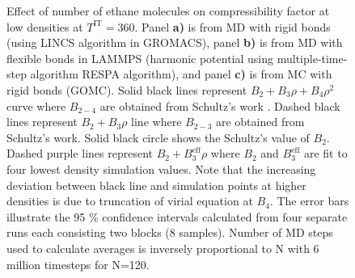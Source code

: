 \documentclass[5p,times]{elsarticle}
\begin{document}
\begin{figure}
\caption{ Effect of number of ethane molecules on compressibility factor at low densities at $T^{\mathrm{IT}}=360$. Panel \textbf{a)} is from MD with rigid bonds (using LINCS algorithm \cite{hess1997lincs} in GROMACS), panel \textbf{b)} is from MD with flexible bonds in LAMMPS (harmonic potential using multiple-time-step algorithm RESPA \cite{tuckerman1992} algorithm), and panel \textbf{c)} is from MC with rigid bonds (GOMC). 
Solid black lines represent $B_2+B_3 \rho+B_4 \rho^2$ curve where $B_{2-4}$ are obtained from Schultz's work \cite{Schultz2010a}. Dashed black lines represent $B_2+B_3 \rho$ line where $B_{2-3}$ are obtained from Schultz's work. Solid black circle shows the Schultz's value of $B_2$. Dashed purple lines represent $B_2+B_3^\mathrm{eff}\rho$ where $B_2$ and $B_3^\mathrm{eff}$ are fit to four lowest density simulation values. Note that the increasing  deviation between black line and simulation points at higher densities is due to truncation of virial equation at $B_4$. The error bars illustrate the 95 \% confidence intervals calculated from four separate runs each consisting two blocks (8 samples). Number of MD steps used to calculate averages is inversely proportional to N with 6 million timesteps for N=120.
}
\label{fig:FSE_TraPPE_C2_abc}
\end{figure}
\end{document}
